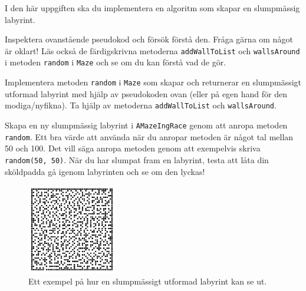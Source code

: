 

\Task I den här uppgiften ska du implementera en algoritm som skapar en slumpmässig labyrint.

\Subtask Inspektera ovanstående pseudokod och försök förstå den. Fråga gärna om något är oklart! Läs också de färdigskrivna metoderna \texttt{addWallToList} och \texttt{wallsAround} i metoden \texttt{random} i \texttt{Maze} och se om du kan förstå vad de gör.

\Subtask Implementera metoden \texttt{random} i \texttt{Maze} som skapar och returnerar en slumpmässigt utformad labyrint med hjälp av pseudokoden ovan (eller på egen hand för den modiga/nyfikna). Ta hjälp av metoderna \texttt{addWallToList} och \texttt{wallsAround}.

\Subtask Skapa en ny slumpmässig labyrint i \texttt{AMazeIngRace} genom att anropa metoden \texttt{random}. Ett bra värde att använda när du anropar metoden är något tal mellan 50 och 100. Det vill säga anropa metoden genom att exempelvis skriva \texttt{random(50, 50)}. När du har slumpat fram en labyrint, testa att låta din sköldpadda gå igenom labyrinten och se om den lyckas!


\begin{figure}[h]
	\begin{center}
		\includegraphics[width=0.35\textwidth]{../img/w09-lab/RandomMaze.jpg}
	\end{center}
	\caption{Ett exempel på hur en slumpmässigt utformad labyrint kan se ut.}
\end{figure}


